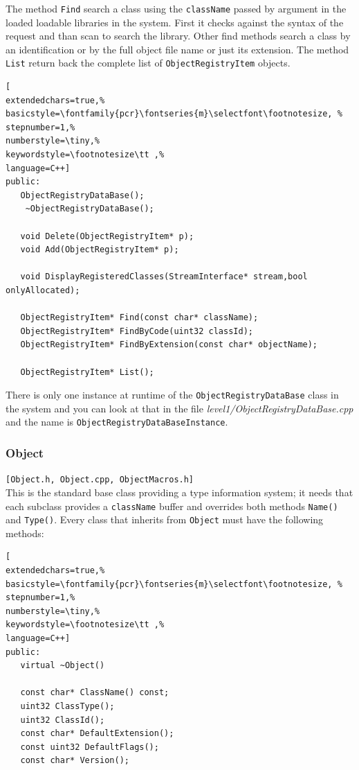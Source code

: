 The method \texttt{Find} search a class using the \texttt{className} passed by argument in the loaded loadable libraries in the system. First it checks against the syntax of the request and than scan to search the library.
Other find methods search a class by an identification or by the full object file name or just its extension. The method \texttt{List} return back the complete list of \texttt{ObjectRegistryItem} objects.

\begin{lstlisting}[
extendedchars=true,%
basicstyle=\fontfamily{pcr}\fontseries{m}\selectfont\footnotesize, %
stepnumber=1,%
numberstyle=\tiny,%
keywordstyle=\footnotesize\tt ,%
language=C++]
public:
   ObjectRegistryDataBase();
    ~ObjectRegistryDataBase();

   void Delete(ObjectRegistryItem* p);
   void Add(ObjectRegistryItem* p);

   void DisplayRegisteredClasses(StreamInterface* stream,bool onlyAllocated);

   ObjectRegistryItem* Find(const char* className);
   ObjectRegistryItem* FindByCode(uint32 classId);
   ObjectRegistryItem* FindByExtension(const char* objectName);

   ObjectRegistryItem* List();
\end{lstlisting}

There is only one instance at runtime of the \texttt{ObjectRegistryDataBase} class in the system and you can look at that in the file \textit{level1/ObjectRegistryDataBase.cpp} and the name is \texttt{ObjectRegistryDataBaseInstance}.



\subsubsection{Object}
\texttt{[Object.h, Object.cpp, ObjectMacros.h]}\\
This is the standard base class providing a type information system; it needs that each subclass provides a \texttt{className} buffer and overrides both methods \texttt{Name()} and \texttt{Type()}. Every class that inherits from \texttt{Object} must have the following methods:

\begin{lstlisting}[
extendedchars=true,%
basicstyle=\fontfamily{pcr}\fontseries{m}\selectfont\footnotesize, %
stepnumber=1,%
numberstyle=\tiny,%
keywordstyle=\footnotesize\tt ,%
language=C++]
public:
   virtual ~Object()

   const char* ClassName() const;
   uint32 ClassType();
   uint32 ClassId();
   const char* DefaultExtension();
   const uint32 DefaultFlags();
   const char* Version();
\end{lstlisting}

